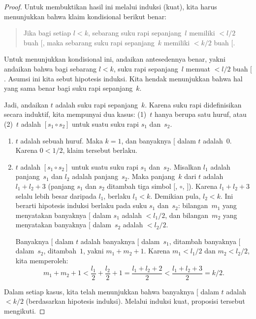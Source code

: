 \documentclass[../../../include/open-logic-section]{subfiles}
\begin{document}
\begin{proof}
Untuk membuktikan hasil ini melalui induksi (kuat), kita harus menunjukkan
bahwa klaim kondisional berikut benar:
\begin{quote}
  Jika bagi setiap $l < k$, sebarang suku rapi sepanjang~$l$ memiliki
  $< l/2$ buah $[$, maka sebarang suku rapi sepanjang~$k$ memiliki
  $< k/2$ buah $[$.
\end{quote}
Untuk menunjukkan kondisional ini, andaikan antesedennya benar, yakni
andaikan bahwa bagi sebarang $l<k$, suku rapi sepanjang~$l$ memuat
$< l/2$ buah $[$. Asumsi ini kita sebut hipotesis induksi. Kita hendak
menunjukkan bahwa hal yang sama benar bagi suku rapi sepanjang~$k$.

Jadi, andaikan $t$ adalah suku rapi sepanjang~$k$. Karena suku rapi
didefinisikan secara induktif, kita mempunyai dua kasus: (1)~$t$ hanya
berupa satu huruf, atau (2)~$t$ adalah $[s_1 \circ s_2]$ untuk suatu suku
rapi $s_1$ dan~$s_2$.
\begin{enumerate}
\item $t$ adalah sebuah huruf. Maka $k = 1$, dan banyaknya $[$ dalam $t$
adalah~$0$. Karena $0 < 1/2$, klaim tersebut berlaku.
\item $t$ adalah $[s_1 \circ s_2]$ untuk suatu suku rapi $s_1$ dan~$s_2$.
  Misalkan $l_1$ adalah panjang~$s_1$ dan $l_2$ adalah panjang~$s_2$.
  Maka panjang~$k$ dari $t$ adalah $l_1+l_2+3$ (panjang $s_1$ dan $s_2$
  ditambah tiga simbol $[$, $\circ$, $]$). Karena $l_1+l_2+3$ selalu lebih
  besar daripada $l_1$, berlaku $l_1 < k$. Demikian pula, $l_2 < k$. Ini
  berarti hipotesis induksi berlaku pada suku $s_1$ dan~$s_2$:
  bilangan~$m_1$ yang menyatakan banyaknya $[$ dalam $s_1$ adalah
  $< l_1/2$, dan
  bilangan~$m_2$ yang menyatakan banyaknya $[$ dalam~$s_2$ adalah
  $< l_2/2$.

  Banyaknya $[$ dalam $t$ adalah banyaknya $[$ dalam~$s_1$, ditambah
  banyaknya $[$ dalam~$s_2$, ditambah~$1$, yakni $m_1 + m_2 + 1$. Karena
  $m_1 < l_1/2$ dan $m_2 < l_2/2$, kita memperoleh:
  \[
  m_1 + m_2 + 1 < \frac{l_1}{2} + \frac{l_2}{2} + 1 = \frac{l_1+l_2+2}{2} < \frac{l_1+l_2+3}{2} = k/2.
  \]
\end{enumerate}
Dalam setiap kasus, kita telah menunjukkan bahwa banyaknya $[$ dalam $t$
adalah $< k/2$ (berdasarkan hipotesis induksi). Melalui induksi kuat,
proposisi tersebut mengikuti.
\end{proof}
\end{document}
